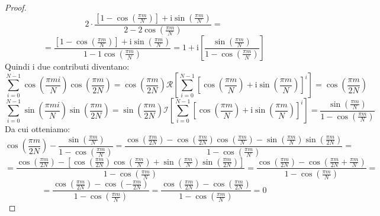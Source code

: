 \begin{proposizione}
\begin{proof}
\begin{equation*}
            2 \cdot \frac{\left[1 - \cos\left(\frac{\pi m}{N}\right)\right] + \text{i} \sin\left(\frac{\pi m}{N}\right)}{2 - 2\cos\left(\frac{\pi m}{N}\right)} =
        \end{equation*}
        \begin{equation*}
            = \frac{\left[1 - \cos\left(\frac{\pi m}{N}\right)\right] + \text{i} \sin\left(\frac{\pi m}{N}\right)}{1 - 1\cos\left(\frac{\pi m}{N}\right)} =
            1 + \text{i} \left[\frac{\sin\left(\frac{\pi m}{N}\right)}{1 - \cos \left(\frac{\pi m}{N}\right)}\right]
        \end{equation*}
        Quindi i due contributi diventano:
        \begin{equation*}
            \sum_{i=0}^{N-1} \cos\left(\frac{\pi mi}{N}\right)\cos\left(\frac{\pi m}{2N}\right) =
            \cos\left(\frac{\pi m}{2N}\right) \mathcal{R} \left[\sum_{i = 0}^{N - 1}\left[ \cos\left(\frac{\pi m}{N}\right) + \text{i} \sin\left(\frac{\pi m}{N}\right)\right]^i\right]
            = \cos\left(\frac{\pi m}{2N}\right)
        \end{equation*}
        \begin{equation*}
            \sum_{i=0}^{N-1} \sin\left(\frac{\pi mi}{N}\right)\sin\left(\frac{\pi m}{2N}\right) =
            \sin\left(\frac{\pi m}{2N}\right) \mathcal{I} \left[\sum_{i = 0}^{N - 1} \left[\cos\left(\frac{\pi m}{N}\right) + \text{i} \sin\left(\frac{\pi m}{N}\right)\right]^i\right]
            = \frac{\sin\left(\frac{\pi m}{N}\right)}{1 - \cos \left(\frac{\pi m}{N}\right)}
        \end{equation*}
        Da cui otteniamo:
        \begin{equation*}
            \cos\left(\frac{\pi m}{2N}\right) - \frac{\sin\left(\frac{\pi m}{N}\right)}{1 - \cos \left(\frac{\pi m}{N}\right)} =
            \frac{\cos\left(\frac{\pi m}{2N}\right) - \cos\left(\frac{\pi m}{2N}\right) \cos \left(\frac{\pi m}{N}\right) - \sin\left(\frac{\pi m}{N}\right)\sin\left(\frac{\pi m}{2N}\right)}{1 - \cos \left(\frac{\pi m}{N}\right)} =
        \end{equation*}
        \begin{equation*}
            = \frac{\cos\left(\frac{\pi m}{2N}\right) - \left[\cos\left(\frac{\pi m}{2N}\right) \cos \left(\frac{\pi m}{N}\right) + \sin\left(\frac{\pi m}{N}\right)\sin\left(\frac{\pi m}{2N}\right)\right]}{1 - \cos \left(\frac{\pi m}{N}\right)} =
            \frac{\cos\left(\frac{\pi m}{2N}\right) - \cos\left(\frac{\pi m}{2N} + \frac{\pi m}{N}\right)}{1 - \cos \left(\frac{\pi m}{N}\right)} =
        \end{equation*}
        \begin{equation*}
            = \frac{\cos\left(\frac{\pi m}{2N}\right) - \cos\left(- \frac{\pi m}{2N}\right)}{1 - \cos \left(\frac{\pi m}{N}\right)}
            = \frac{\cos\left(\frac{\pi m}{2N}\right) - \cos\left(\frac{\pi m}{2N}\right)}{1 - \cos \left(\frac{\pi m}{N}\right)} = 0
        \end{equation*}
    \end{proof}
\end{proposizione}
